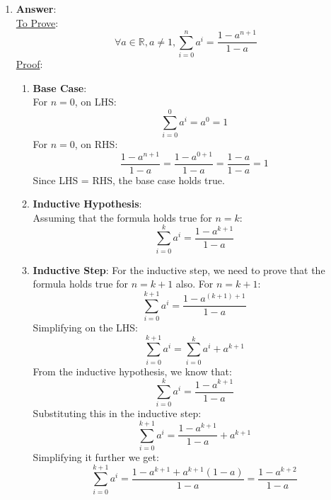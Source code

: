 \documentclass[11pt]{article}
\begin{document}
\begin{enumerate}
\item \textbf{Answer}: \\
\uline{To Prove}:
\begin{equation*}
    \forall a \in \mathbb{R}, a\neq 1, \sum_{i=0}^{n} a^i = \frac{1-a^{n+1}}{1-a}
\end{equation*}
\uline{Proof}:
\begin{enumerate}
    \item \textbf{Base Case}:\\
    For $n = 0$, on LHS:
    \begin{equation*}
        \sum_{i=0}^{0} a^i = a^0 = 1
    \end{equation*}
    For $n = 0$, on RHS:
    \begin{equation*}
        \frac{1-a^{n+1}}{1-a} = \frac{1-a^{0+1}}{1-a} = \frac{1-a}{1-a} = 1
    \end{equation*}
    Since LHS = RHS, the base case holds true.
    \item \textbf{Inductive Hypothesis}:\\
    Assuming that the formula holds true for $n = k$:
    \begin{equation*}
        \sum_{i=0}^{k} a^i = \frac{1-a^{k+1}}{1-a}
    \end{equation*}
\item \textbf{Inductive Step}:
For the inductive step, we need to prove that the formula holds true for $n = k + 1$ also.
    For $n = k+1$: \\
    \begin{equation*}
        \sum_{i=0}^{k+1} a^i = \frac{1-a^{(k+1)+1}}{1-a}
    \end{equation*}
    Simplifying on the LHS: 
    \begin{equation*}
        \sum_{i=0}^{k+1} a^i = \sum_{i=0}^{k} a^i + a^{k+1}
    \end{equation*}
    From the inductive hypothesis, we know that:
    \begin{equation*}
        \sum_{i=0}^{k} a^i = \frac{1-a^{k+1}}{1-a}
    \end{equation*}
    Substituting this in the inductive step:
    \begin{equation*}
        \sum_{i=0}^{k+1} a^i = \frac{1-a^{k+1}}{1-a} + a^{k+1}
    \end{equation*}
    Simplifying it further we get:
    \begin{equation*}
        \sum_{i=0}^{k+1} a^i = \frac{1-a^{k+1}+a^{k+1}(1-a)}{1-a} = \frac{1-a^{k+2}}{1-a}
    \end{equation*}


\end{enumerate}
\end{enumerate}
\end{document}
